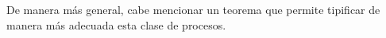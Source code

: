
De manera m\'as general, cabe mencionar un teorema que permite tipificar de manera m\'as
adecuada esta clase de procesos.

